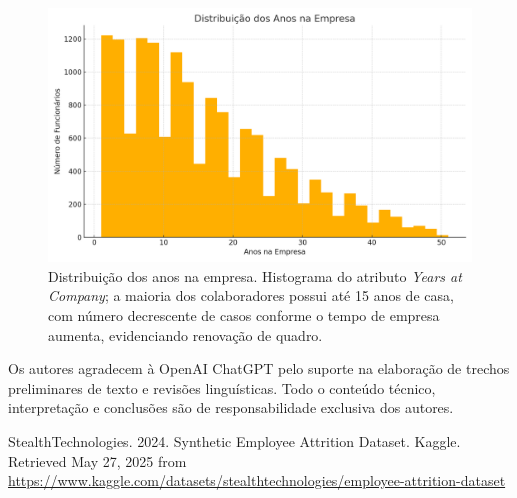 \documentclass[sigconf]{acmart}
\begin{document}
\begin{figure}[!htbp]
    \centering
    \includegraphics[width=\linewidth]{images/years_at_company_histogram.png}
    \caption{Distribuição dos anos na empresa. Histograma do atributo \textit{Years at Company}; a maioria dos colaboradores possui até 15 anos de casa, com número decrescente de casos conforme o tempo de empresa aumenta, evidenciando renovação de quadro.}
\end{figure}

\begin{acks}
Os autores agradecem à OpenAI ChatGPT pelo suporte na elaboração de trechos preliminares de texto e revisões linguísticas. Todo o conteúdo técnico, interpretação e conclusões são de responsabilidade exclusiva dos autores.
\end{acks}


\begin{thebibliography}{9}

StealthTechnologies. 2024.
\newblock Synthetic Employee Attrition Dataset.
\newblock Kaggle. Retrieved May 27, 2025 from
  \url{https://www.kaggle.com/datasets/stealthtechnologies/employee-attrition-dataset}

\end{thebibliography}
\end{document}
